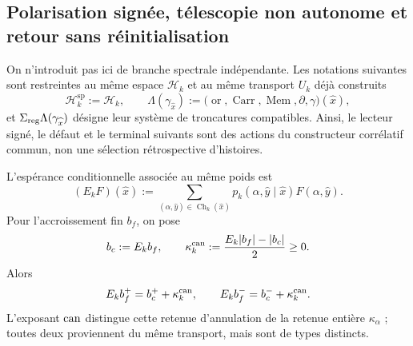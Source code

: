\subsection{Polarisation signée, télescopie non autonome et retour sans réinitialisation}
On n'introduit pas ici de branche spectrale indépendante. Les notations suivantes sont restreintes au même espace \(\mathscr H_k\) et au même transport \(U_k\) déjà construits
\[
 \mathcal H_k^{\mathrm{sp}}:=\mathscr H_k,
 \qquad
 \Lambda(\gamma_{\widehat x})
 :=\bigl(\operatorname{or},\operatorname{Carr},\operatorname{Mem},
          \partial,\gamma\bigr)(\widehat x),
\]
et \(\Sigma_{\rm reg}\Lambda(\gamma_{\widehat x})\) désigne leur système de troncatures compatibles. Ainsi, le lecteur signé, le défaut et le terminal suivants sont des actions du constructeur corrélatif commun, non une sélection rétrospective d'histoires.
\begingroup
\let\section\subsection


\endgroup

L'espérance conditionnelle associée au même poids est
\begin{equation}
\label{eq:pdfv2-cor-esperanza-comun}
 (E_kF)(\widehat x):=
 \sum_{(\alpha,\widehat y)\in\operatorname{Ch}_k(\widehat x)}
 p_k(\alpha,\widehat y\mid\widehat x)F(\alpha,\widehat y).
\end{equation}
Pour l'accroissement fin \(b_f\), on pose
\begin{equation}
\label{eq:pdfv2-cor-kappa-jensen}
 b_c:=E_kb_f,\qquad
 \kappa_k^{\rm can}:=\frac{E_k|b_f|-|b_c|}{2}\geq0.
\end{equation}
Alors
\begin{equation}
\label{eq:pdfv2-cor-jensen-hojas}
 E_kb_f^+=b_c^++\kappa_k^{\rm can},\qquad
 E_kb_f^-=b_c^-+\kappa_k^{\rm can}.
\end{equation}
L'exposant \({\rm can}\) distingue cette retenue d'annulation de la retenue entière \(\kappa_\alpha\) ; toutes deux proviennent du même transport, mais sont de types distincts.

